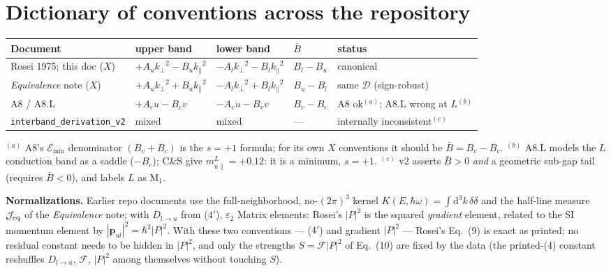 \documentclass[11pt,a4paper]{article}
\numberwithin{equation}{section}
\begin{document}
\section{Dictionary of conventions across the repository}\label{app:dict}

\begin{center}
\footnotesize
\setlength{\tabcolsep}{4pt}
\begin{tabular}{lllll}
\toprule
Document & upper band & lower band & ${\bar{B}}$ & status \\
\midrule
Rosei 1975; this doc ($X$) & $+A_u{k_{\perp}}^2-B_u{k_{\parallel}}^2$ & $-A_l{k_{\perp}}^2-B_l{k_{\parallel}}^2$ & $B_l-B_u$ & canonical \\
\emph{Equivalence} note ($X$) & $+A_u{k_{\perp}}^2+B_u{k_{\parallel}}^2$ & $-A_l{k_{\perp}}^2+B_l{k_{\parallel}}^2$ & $B_u-B_l$ & same ${\mathcal{D}}$ (sign-robust) \\
A8 / A8.L & $+A_c u-B_c v$ & $-A_v u-B_v v$ & $B_v-B_c$ & A8 ok$^{(a)}$; A8.L wrong at $L$$^{(b)}$ \\
\texttt{interband\_derivation\_v2} & mixed & mixed & --- & internally inconsistent$^{(c)}$ \\
\bottomrule
\end{tabular}\end{center}
{\footnotesize
$^{(a)}$ A8's $\mathcal{E}_{\min}$ denominator $(B_v{+}B_c)$ is the
$s{=}{+}1$ formula; for its own $X$ conventions it should be
${\bar{B}}=B_v{-}B_c$.\quad
$^{(b)}$ A8.L models the $L$ conduction band as a saddle ($-B_c$);
C\&S give $m_{u\parallel}^L=+0.12$: it is a minimum, $s=+1$.\quad
$^{(c)}$ v2 asserts ${\bar{B}}>0$ \emph{and} a geometric sub-gap tail
(requires ${\bar{B}}<0$), and labels $L$ as M$_1$.}

\medskip
\noindent\textbf{Normalizations.}  Earlier repo documents use the
full-neighborhood, no-$(2\pi)^3$ kernel
$K(E,{\hbar\omega})=\int{\mathrm{d}}^3k\,\delta\delta$ and the half-line measure
$\mathcal J_{\rm eq}$ of the \emph{Equivalence} note; with ${D_{l\to u}}$ from
($4'$),
${\varepsilon}_2$
Matrix elements: Rosei's $|P|^2$ is the squared \emph{gradient}
element, related to the SI momentum element by
$|{\mathbf{p}_{ul}}|^2=\hbar^2|P|^2$.  With these two conventions --- ($4'$) and
gradient $|P|^2$ --- Rosei's Eq.~(9) is exact as printed; no residual
constant needs to be hidden in $|P|^2$, and only the strengths
$S={\mathcal{F}}|P|^2$ of Eq.~(10) are fixed by the data (the printed-(4)
constant reshuffles ${D_{l\to u}}$, ${\mathcal{F}}$, $|P|^2$ among themselves without
touching $S$).
\end{document}
